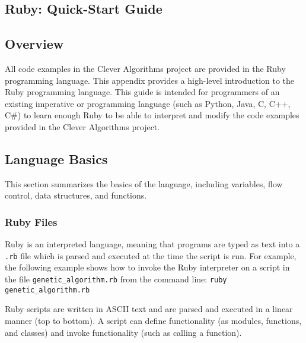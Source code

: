 

\renewcommand{\chaptermark}[1]{\markboth{\thechapter.\ #1}{}}
\begin{bibunit}
\chapter{Ruby: Quick-Start Guide}
\label{ch:appendix1}

\section{Overview}
All code examples in the Clever Algorithms project are provided in the Ruby programming language.
This appendix provides a high-level introduction to the Ruby programming language. This guide is intended for programmers of an existing imperative or programming language (such as Python, Java, C, C++, C\#) to learn enough Ruby to be able to interpret and modify the code examples provided in the Clever Algorithms project.

\section{Language Basics}
This section summarizes the basics of the language, including variables, flow control, data structures, and functions.

\subsection{Ruby Files}
Ruby is an interpreted language, meaning that programs are typed as text into a \texttt{.rb} file which is parsed and executed at the time the script is run. For example, the following example shows how to invoke the Ruby interpreter on a script in the file \texttt{genetic\_algorithm.rb} from the command line: \texttt{ruby genetic\_algorithm.rb}

Ruby scripts are written in ASCII text and are parsed and executed in a linear manner (top to bottom). A script can define functionality (as modules, functions, and classes) and invoke functionality (such as calling a function). 


\end{bibunit}
